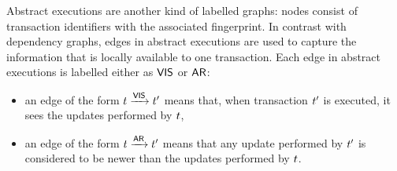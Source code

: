 
Abstract executions are another kind of labelled 
graphs: nodes consist of transaction identifiers with the associated fingerprint. %
In contrast with dependency graphs, edges in abstract executions are used to 
capture the information that is locally available to one transaction. Each 
edge in abstract executions is labelled either as $\mathsf{VIS}$ or $\mathsf{AR}$: 
\begin{itemize}
\item an edge of the form $t \xrightarrow{\mathsf{VIS}} t'$ means that, when transaction 
$t'$ is executed, it sees the updates performed by $t$,
\item an edge of the form $t \xrightarrow{\mathsf{AR}} t'$ means that any update 
performed by $t'$ is considered to be newer than the updates performed by $t$. 
\end{itemize}

